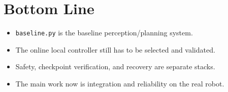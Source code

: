 \documentclass[11pt,a4paper]{article}
\begin{document}
\section{Bottom Line}

\begin{mdframed}
\begin{itemize}[nosep]
  \item \texttt{baseline.py} is the baseline perception/planning system.
  \item The online local controller still has to be selected and validated.
  \item Safety, checkpoint verification, and recovery are separate stacks.
  \item The main work now is integration and reliability on the real robot.
\end{itemize}
\end{mdframed}
\end{document}
